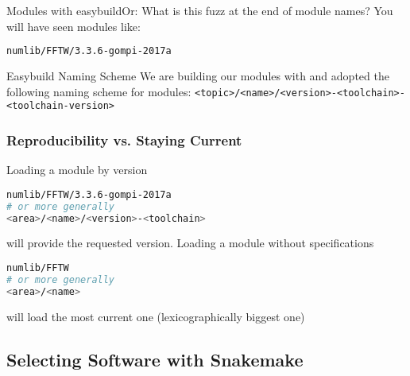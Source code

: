 \begin{frame}[fragile]
   {Modules with easybuild\newline Or: What is this fuzz at the end of module names?}
   You will have seen modules like:
   \begin{lstlisting}[language=Bash, style=Shell]
numlib/FFTW/3.3.6-gompi-2017a   
   \end{lstlisting}
   \pause
   \begin{block}{Easybuild Naming Scheme}
    We are building our modules with  and adopted the following naming scheme for modules:\newline
    \footnotesize \verb+<topic>/<name>/<version>-<toolchain>-<toolchain-version>+
   \end{block}
   \pause
\end{frame}

\begin{frame}[fragile]
  \frametitle{Reproducibility vs. Staying Current}
  Loading a module by version
  \begin{lstlisting}[language=Bash, style=Shell]
numlib/FFTW/3.3.6-gompi-2017a 
# or more generally
<area>/<name>/<version>-<toolchain>
\end{lstlisting}
   will provide the requested version.\pause
   Loading a module without specifications
     \begin{lstlisting}[language=Bash, style=Shell]
numlib/FFTW
# or more generally
<area>/<name>
   \end{lstlisting}
   will load the most current one (lexicographically biggest one)
\end{frame}


\subsection{Selecting Software with Snakemake}

